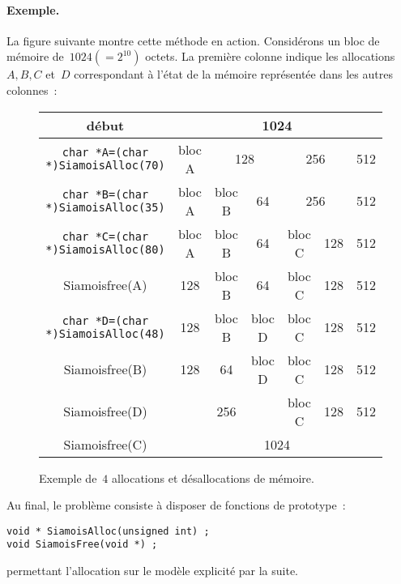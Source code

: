 \paragraph{Exemple.}
La figure suivante montre cette m\'ethode en action. Consid\'erons un
bloc de m\'emoire de~${1024(=2^{10})}$ octets. La premi\`ere colonne indique
les allocations~$A, B, C$ et~$D$ correspondant \`a l'\'etat de la
m\'emoire repr\'esent\'ee dans les autres colonnes~:
\begin{figure}[htbp]
  \centering
  \begin{tabular}{|c|c|c|c|c|c|c|c|c|c|c|c|c|c|c|c|c|}
 \hline
     d\'ebut &  \multicolumn{16}{|c|}{1024} \\ \hline
    \verb+char *A=(char *)SiamoisAlloc(70)+
    & \multicolumn{2}{|c|}{bloc A} & \multicolumn{2}{|c|}{128} &
    \multicolumn{4}{|c|}{256} & \multicolumn{8}{|c|}{512} \\ \hline
    \verb+char *B=(char *)SiamoisAlloc(35)+
    & \multicolumn{2}{|c|}{bloc A} & bloc B & 64 &
    \multicolumn{4}{|c|}{256} & \multicolumn{8}{|c|}{512} \\ \hline
    \verb+char *C=(char *)SiamoisAlloc(80)+ 
    & \multicolumn{2}{|c|}{bloc A} & bloc B & 64 &
    \multicolumn{2}{|c|}{bloc C} & 
    \multicolumn{2}{|c|}{128} & \multicolumn{8}{|c|}{512} \\ \hline
    Siamoisfree(A) & \multicolumn{2}{|c|}{128} & bloc B & 64 &
    \multicolumn{2}{|c|}{bloc C} & \multicolumn{2}{|c|}{128} & \multicolumn{8}{|c|}{512} \\ \hline
    \verb+char *D=(char *)SiamoisAlloc(48)+
    & \multicolumn{2}{|c|}{128} & bloc B & bloc D &
    \multicolumn{2}{|c|}{bloc C} & \multicolumn{2}{|c|}{128} & \multicolumn{8}{|c|}{512} \\ \hline
    Siamoisfree(B) & \multicolumn{2}{|c|}{128} & 64 & bloc D &
    \multicolumn{2}{|c|}{bloc C} & \multicolumn{2}{|c|}{128} & \multicolumn{8}{|c|}{512} \\ \hline
    Siamoisfree(D) & \multicolumn{4}{|c|}{256} &
    \multicolumn{2}{|c|}{bloc C} & \multicolumn{2}{|c|}{128} & \multicolumn{8}{|c|}{512} \\ \hline

    Siamoisfree(C) & \multicolumn{16}{|c|}{1024} \\ \hline
  \end{tabular}
  \caption{Exemple de~$4$ allocations et d\'esallocations de m\'emoire.}
  \label{fig:Allocation}
\end{figure}
\par
Au final, le probl\`eme consiste \`a disposer de fonctions de
prototype~:
\begin{verbatim}
void * SiamoisAlloc(unsigned int) ;
void SiamoisFree(void *) ;
\end{verbatim}
permettant l'allocation sur le mod\`ele explicit\'e par la suite.
